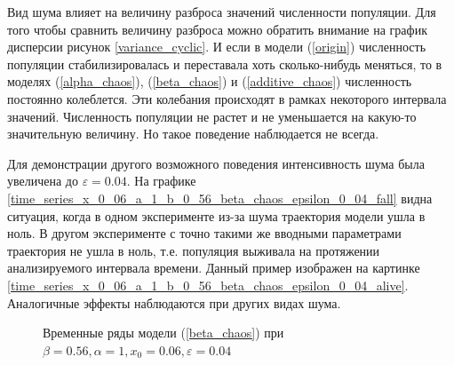     Вид шума влияет на величину разброса значений численности популяции. Для того чтобы сравнить величину разброса можно обратить внимание на график дисперсии рисунок \ref{variance_cyclic}. И если в модели (\ref{origin}) численность популяции стабилизировалась и переставала хоть сколько-нибудь меняться, то в моделях (\ref{alpha_chaos}), (\ref{beta_chaos}) и (\ref{additive_chaos}) численность постоянно колеблется. Эти колебания происходят в рамках некоторого интервала значений. Численность популяции не растет и не уменьшается на какую-то значительную величину. Но такое поведение наблюдается не всегда.

    Для демонстрации другого возможного поведения интенсивность шума была увеличена до \(\varepsilon = 0.04\). На графике \ref{time_series_x_0_06_a_1_b_0_56_beta_chaos_epsilon_0_04_fall} видна ситуация, когда в одном эксперименте из-за шума траектория модели ушла в ноль. В другом эксперименте с точно такими же вводными параметрами траектория не ушла в ноль, т.е. популяция выживала на протяжении анализируемого интервала времени. Данный пример изображен на картинке \ref{time_series_x_0_06_a_1_b_0_56_beta_chaos_epsilon_0_04_alive}. Аналогичные эффекты наблюдаются при других видах шума.

    \begin{figure}
        \centering
        
        \caption{Временные ряды модели (\ref{beta_chaos}) при \(\beta = 0.56, \alpha = 1, x_0 = 0.06, \varepsilon = 0.04\)}
    \end{figure}


